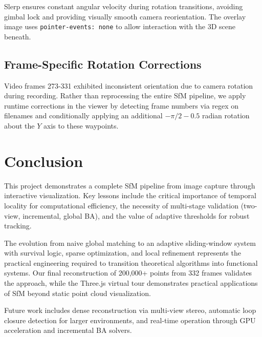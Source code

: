 \documentclass[10pt,twocolumn,letterpaper]{article}
\begin{document}
Slerp ensures constant angular velocity during rotation transitions, avoiding gimbal lock and providing visually smooth camera reorientation. The overlay image uses \texttt{pointer-events: none} to allow interaction with the 3D scene beneath.

\subsection{Frame-Specific Rotation Corrections}

Video frames 273-331 exhibited inconsistent orientation due to camera rotation during recording. Rather than reprocessing the entire SfM pipeline, we apply runtime corrections in the viewer by detecting frame numbers via regex on filenames and conditionally applying an additional $-\pi/2 - 0.5$ radian rotation about the $Y$ axis to these waypoints.

\section{Conclusion}

This project demonstrates a complete SfM pipeline from image capture through interactive visualization. Key lessons include the critical importance of temporal locality for computational efficiency, the necessity of multi-stage validation (two-view, incremental, global BA), and the value of adaptive thresholds for robust tracking.

The evolution from naive global matching to an adaptive sliding-window system with survival logic, sparse optimization, and local refinement represents the practical engineering required to transition theoretical algorithms into functional systems. Our final reconstruction of 200,000+ points from 332 frames validates the approach, while the Three.js virtual tour demonstrates practical applications of SfM beyond static point cloud visualization.

Future work includes dense reconstruction via multi-view stereo, automatic loop closure detection for larger environments, and real-time operation through GPU acceleration and incremental BA solvers.
\end{document}
